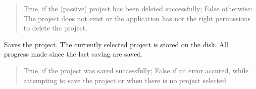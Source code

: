 \documentclass[letterpaper,10pt,english]{sphinxmanual}
\begin{document}
\begin{fulllineitems}
\begin{fulllineitems}
\begin{quote}
\begin{description}
\sphinxAtStartPar
True, if the (passive) project has been deleted successfully; False otherwise: The project does not exist or the application has not the right permissions to delete the project.

\sphinxAtStartPar
{}

\end{description}\end{quote}

\end{fulllineitems}


\begin{fulllineitems}
\label{\detokenize{apidoc/src.osm_configurator.control:src.osm_configurator.control.control_interface.IControl.save_project}}
\pysigstartsignatures
{}
\pysigstopsignatures
\sphinxAtStartPar
Saves the project.
The currently selected project is stored on the disk. All progress made since the last saving are saved.
\begin{quote}\begin{description}
\sphinxAtStartPar
True, if the project was saved successfully; False if an error accured, while attempting to save the project or when there is no project selected.

\sphinxAtStartPar
{}

\end{description}\end{quote}

\end{fulllineitems}



\end{fulllineitems}
\end{document}
